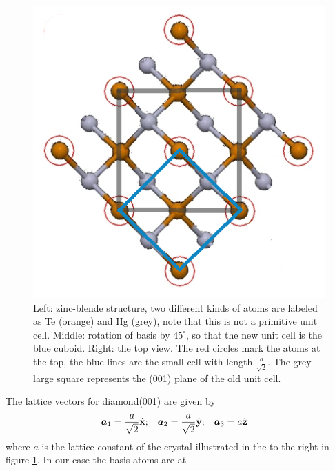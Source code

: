 \begin{figure}[h!]
\begin{minipage}[c]{.32\linewidth}
		\end{minipage}
		\hfill
		\begin{minipage}[c]{.32\linewidth}
			\centering
			\includegraphics[width=.9\linewidth]{andere_bilder/001_plane_2.jpg}
		\end{minipage}
		\caption{Left: zinc-blende structure, two different kinds of atoms are labeled as Te (orange) and Hg (grey), note that this is not a primitive unit cell. Middle: rotation of basis by $45^\circ$, so that the new unit cell is the blue cuboid. Right: the top view. The red circles mark the atoms at the top, the blue lines are the small cell with length $\frac{a}{\sqrt{2}}$. The grey large square represents the (001) plane of the old unit cell.} \label{hgte_diamond001}
	\end{figure}
	The lattice vectors for diamond(001) are given by
	\begin{align} \label{001_basis}
		\boldsymbol{a}_1&=\frac{a}{\sqrt{2}} \hat{\textbf{x}}; &
		\boldsymbol{a}_2&=\frac{a}{\sqrt{2}} \hat{\textbf{y}}; &
		\boldsymbol{a}_3&=a \hat{\textbf{z}}
	\end{align}
	where $a$ is the lattice constant of the crystal \cite{Graz} illustrated in the to the right in figure \ref{hgte_diamond001}. 
	In our case the basis atoms are at
	\\
